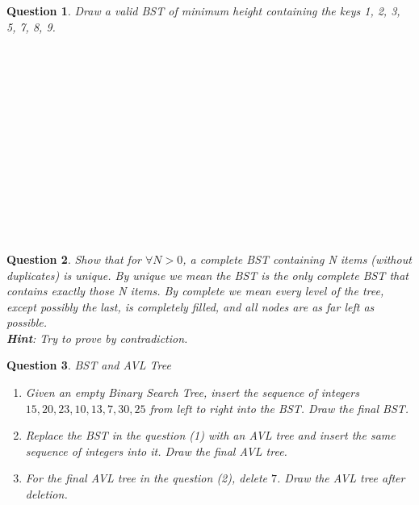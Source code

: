 \documentclass[10.5pt]{article}
\newtheorem{Q}{Question}
\begin{document}
\begin{Q}
Draw a valid BST of minimum height containing the keys 1, 2, 3, 5, 7, 8, 9.
\\
\\
\\
\\
\\
\\
\\
\\
\\
\\
\\
\\
\\
\\

\end{Q}

\begin{Q}
Show that for $\forall N > 0$, a complete BST containing N items (without duplicates) is unique. By unique we mean
the BST is the only complete BST that contains exactly those N items. By complete we mean every level of the tree, except possibly the last, is completely filled, and all nodes are as far left as possible. 
\\ 
\textbf{Hint}: Try to prove by contradiction.

\end{Q}

\newpage
\begin{Q}BST and AVL Tree

\begin{enumerate}[(1)]
    \item 
        Given an empty Binary Search Tree, insert the sequence of integers $15, 20, 23, 10, 13, 7, 30, 25$ from left to right into the BST. Draw the final BST.\\
        
        \vspace{30ex}
        
    \item
        Replace the BST in the question (1) with an AVL tree and insert the same sequence of integers into it. Draw the final AVL tree.\\
        \vspace{30ex}
    \item
        For the final AVL tree in the question (2), delete $7$. Draw the AVL tree after deletion.\\
        \vspace{30ex}
\end{enumerate}


\end{Q}
\end{document}
